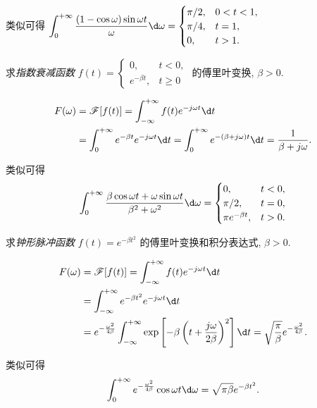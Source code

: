 类似可得
$\displaystyle\int_0^{+\infty}\frac{(1-\cos\omega)\sin\omega t}\omega\d\omega=
	\begin{cases}
		\pi/2,&0<t<1,\\
		\pi/4,&t=1,\\
		0,&t>1.
	\end{cases}$

\begin{example}
	求\emph{指数衰减函数} $f(t)=
		\begin{cases}
			0,&t<0,\\
			e^{-\beta t},&t\ge 0
		\end{cases}$ 的傅里叶变换, $\beta>0$.
\end{example}
\begin{solution}
	\begin{align*}
		F(\omega)&=\msf[f(t)]=\int_{-\infty}^{+\infty}f(t)e^{-j\omega t}\d t\\
		&=\int_0^{+\infty}e^{-\beta t}e^{-j\omega t}\d t
			=\int_0^{+\infty}e^{-(\beta+j\omega)t}\d t
			=\frac1{\beta+j\omega}.
	\end{align*}
\end{solution}

类似可得
	\[\int_0^{+\infty}\frac{\beta\cos\omega t+\omega\sin\omega t}{\beta^2+\omega^2}\d\omega
	=\begin{cases}
		0,&t<0,\\
		\pi/2,&t=0,\\
		\pi e^{-\beta t},&t>0.
	\end{cases}\]

\begin{example}
	求\emph{钟形脉冲函数} $f(t)=e^{-\beta t^2}$ 的傅里叶变换和积分表达式, $\beta>0$.
\end{example}

\begin{solution}
	\begin{align*}
		F(\omega)&=\msf[f(t)]=\int_{-\infty}^{+\infty}f(t)e^{-j\omega t}\d t\\
		&=\int_{-\infty}^{+\infty}e^{-\beta t^2}e^{-j\omega t}\d t\\
		&=e^{-\frac{\omega^2}{4\beta}}\int_{-\infty}^{+\infty}\exp\left[-\beta\left(t+\frac{j\omega}{2\beta}\right)^2\right]\d t
			=\sqrt{\frac\pi\beta}e^{-\frac{\omega^2}{4\beta}}.
	\end{align*}
\end{solution}

类似可得
	\[\int_0^{+\infty}e^{-\frac{\omega^2}{4\beta}}\cos\omega t\d\omega=\sqrt{\pi\beta}e^{-\beta t^2}.\]

